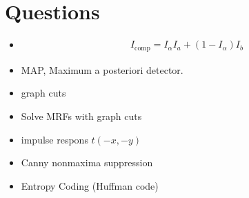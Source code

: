 \newpage
\chapter{Questions}
\begin{itemize}
	\item 
	\begin{gather*}
		I_{\text{comp}}=I_{\alpha}I_{a}+\left( 1-I_{\alpha} \right)I_b
	\end{gather*}
	\item MAP, Maximum a posteriori detector.
	\item graph cuts
	\item Solve MRFs with graph cuts
	\item impulse respons $t(-x,-y)$
	\item Canny nonmaxima suppression
	\item Entropy Coding (Huffman code)
\end{itemize}
